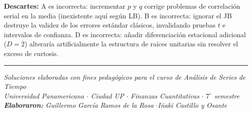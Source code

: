 \documentclass[11pt,a4paper]{article}
\begin{document}
\textbf{Descartes:} A es incorrecta: incrementar $p$ y $q$ corrige problemas de correlación serial en la media (inexistente aquí según LB). B es incorrecta: ignorar el JB destruye la validez de los errores estándar clásicos, invalidando pruebas $t$ e intervalos de confianza. D es incorrecta: añadir diferenciación estacional adicional ($D=2$) alteraría artificialmente la estructura de raíces unitarias sin resolver el exceso de curtosis.

\vspace{12pt}
\noindent\color{azulUP}\rule{\linewidth}{0.8pt}

\begin{center}
{\small\itshape\color{moradoUP}
Soluciones elaboradas con fines pedagógicos para el curso de Análisis de Series de Tiempo \\
Universidad Panamericana $\cdot$ Ciudad UP $\cdot$ Finanzas Cuantitativas $\cdot$ $7^\circ$ semestre \\[4pt]
\textbf{Elaboraron:} Guillermo García Ramos de la Rosa \quad$\cdot$\quad Iñaki Castillo y Osante
}
\end{center}
\end{document}

